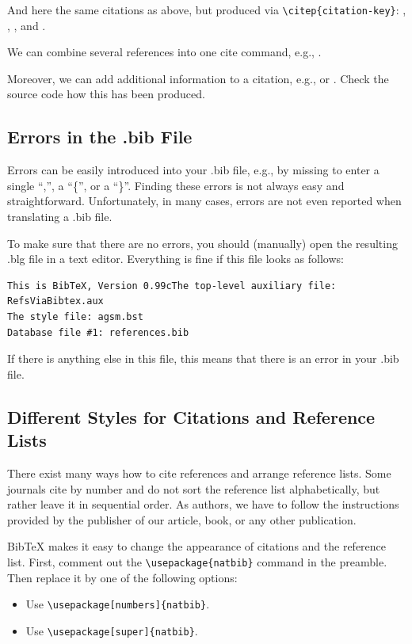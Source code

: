 \documentclass[12pt]{article}
\begin{document}
And here the same citations as above, but produced via
\verb|\citep{citation-key}|:
\citep{Sym2011}, \citep{RS2006}, \citep{SEGVW2004ASA}, and \citep{CW2011}.

We can combine several references into one cite command, e.g.,
\citep{We50,Pajarola:98th}.

Moreover, we can add additional information to a citation, e.g.,
\citep[p.~486]{Sym2011} or \citep[see for example][p.~487]{Sym2011}.
Check the source code how this has been produced.

\subsection{Errors in the .bib File}

Errors can be easily introduced into your .bib file, e.g., by missing to
enter a single ``,'', a ``\{'', or a ``\}''. Finding these errors is not
always easy and straightforward. Unfortunately, in many cases,
errors are not even reported when translating a .bib file.

To make sure that there are no errors, you should (manually)
open the resulting .blg file in a text editor. Everything
is fine if this file looks as follows:
\begin{verbatim}
This is BibTeX, Version 0.99cThe top-level auxiliary file: RefsViaBibtex.aux
The style file: agsm.bst
Database file #1: references.bib
\end{verbatim}

If there is anything else in this file, this means that there is an 
error in your .bib file.

\subsection{Different Styles for Citations and Reference Lists}

There exist many ways how to cite references and arrange reference lists.
Some journals cite by number and do not sort the reference list 
alphabetically, but rather leave it in sequential order. As authors,
we have to follow the instructions provided by the publisher
of our article, book, or any other publication.

BibTeX makes it easy to change the appearance of citations 
and the reference list. First, comment out the 
\verb|\usepackage{natbib}| command in the preamble.
Then replace it by one of the following options:

\begin{itemize}
\item Use \verb|\usepackage[numbers]{natbib}|.
\item Use \verb|\usepackage[super]{natbib}|.
\end{itemize}
\end{document}
